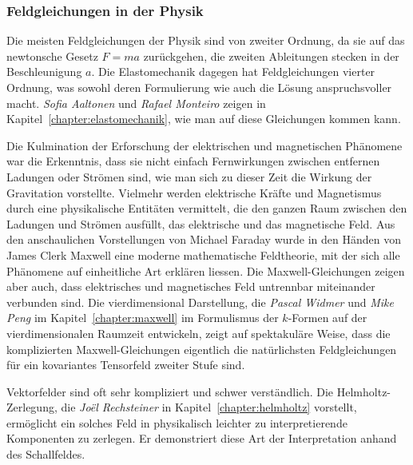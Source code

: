 %
%
\subsubsection{Feldgleichungen in der Physik}

%
%
Die meisten Feldgleichungen der Physik sind von zweiter Ordnung, da
sie auf das newtonsche Gesetz $F=ma$ zurückgehen, die zweiten
Ableitungen stecken in der Beschleunigung $a$.
Die Elastomechanik dagegen hat Feldgleichungen vierter Ordnung,
%
was sowohl deren Formulierung wie auch die Lösung anspruchsvoller
macht.
\emph{Sofia Aaltonen}
%
%
und
\emph{Rafael Monteiro}
%
%
zeigen in Kapitel~\ref{chapter:elastomechanik}, wie man auf diese
Gleichungen kommen kann.

%
%
Die Kulmination der Erforschung der elektrischen und magnetischen
Phänomene war die Erkenntnis, dass sie nicht einfach Fernwirkungen
zwischen entfernen Ladungen oder Strömen sind, wie man sich zu
dieser Zeit die Wirkung der Gravitation vorstellte.
Vielmehr werden elektrische Kräfte und Magnetismus durch eine
physikalische Entitäten vermittelt, die den ganzen Raum zwischen den
Ladungen und Strömen ausfüllt, das elektrische und das magnetische
Feld.
Aus den anschaulichen Vorstellungen von Michael Faraday wurde in den
%
Händen von James Clerk Maxwell eine moderne mathematische Feldtheorie,
%
mit der sich alle Phänomene auf einheitliche Art erklären liessen.
Die Maxwell-Gleichungen zeigen aber auch, dass elektrisches und
magnetisches Feld untrennbar miteinander verbunden sind.
Die vierdimensional Darstellung, die \emph{Pascal Widmer}
%
%
und \emph{Mike Peng}
%
%
im Kapitel~\ref{chapter:maxwell} im Formulismus der $k$-Formen auf
der vierdimensionalen Raumzeit entwickeln, zeigt auf spektakuläre
Weise, dass die komplizierten Maxwell-Gleichungen eigentlich die
natürlichsten Feldgleichungen für ein kovariantes Tensorfeld zweiter
Stufe sind.

%
%
Vektorfelder sind oft sehr kompliziert und schwer verständlich.
Die Helmholtz-Zer\-le\-gung, die
%
\emph{Joël Rechsteiner} 
%
%
in Kapitel~\ref{chapter:helmholtz} vorstellt, ermöglicht ein solches
Feld in physikalisch leichter zu interpretierende Komponenten zu
zerlegen. 
Er demonstriert diese Art der Interpretation anhand des Schallfeldes.


